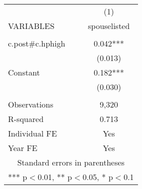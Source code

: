 \begin{tabular}{lc} \hline
 & (1) \\
VARIABLES & spouselisted \\ \hline
 &  \\
c.post\#c.hphigh & 0.042*** \\
 & (0.013) \\
Constant & 0.182*** \\
 & (0.030) \\
 &  \\
Observations & 9,320 \\
R-squared & 0.713 \\
Individual FE & Yes \\
 Year FE & Yes \\ \hline
\multicolumn{2}{c}{ Standard errors in parentheses} \\
\multicolumn{2}{c}{ *** p$<$0.01, ** p$<$0.05, * p$<$0.1} \\
\end{tabular}
